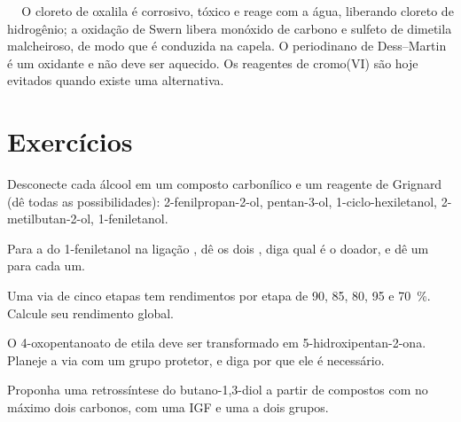 \begin{safety}{\,\,\,\,\,}
O cloreto de oxalila é corrosivo, tóxico e reage com a água, liberando cloreto de hidrogênio; a
oxidação de Swern libera monóxido de carbono e sulfeto de dimetila malcheiroso, de modo que é conduzida
na capela. O periodinano de Dess--Martin é um oxidante e não deve ser aquecido. Os reagentes de
cromo(VI) são hoje evitados quando existe uma alternativa.
\end{safety}

\section{Exercícios}

\begin{exercise}[$\star$]\label{exo:b2:retrosynthesis:1}
Desconecte cada álcool em um composto carbonílico e um reagente de Grignard (dê todas as possibilidades):
2-fenilpropan-2-ol, pentan-3-ol, 1-ciclo-hexiletanol, 2-metilbutan-2-ol, 1-feniletanol.
\end{exercise}

\begin{exercise}[$\star$]\label{exo:b2:retrosynthesis:2}
Para a  do 1-feniletanol na ligação , dê os dois , diga qual é o doador, e dê
um  para cada um.
\end{exercise}

\begin{exercise}[$\star$]\label{exo:b2:retrosynthesis:3}
Uma via de cinco etapas tem rendimentos por etapa de 90, 85, 80, 95 e 70~\%. Calcule seu rendimento global.
\end{exercise}

\begin{exercise}[$\star$]\label{exo:b2:retrosynthesis:4}
O 4-oxopentanoato de etila deve ser transformado em 5-hidroxipentan-2-ona. Planeje a via com um grupo
protetor, e diga por que ele é necessário.
\end{exercise}

\begin{exercise}[$\star\star$]\label{exo:b2:retrosynthesis:5}
Proponha uma retrossíntese do butano-1,3-diol a partir de compostos com no máximo dois carbonos, com
uma IGF e uma  a dois grupos.
\end{exercise}

